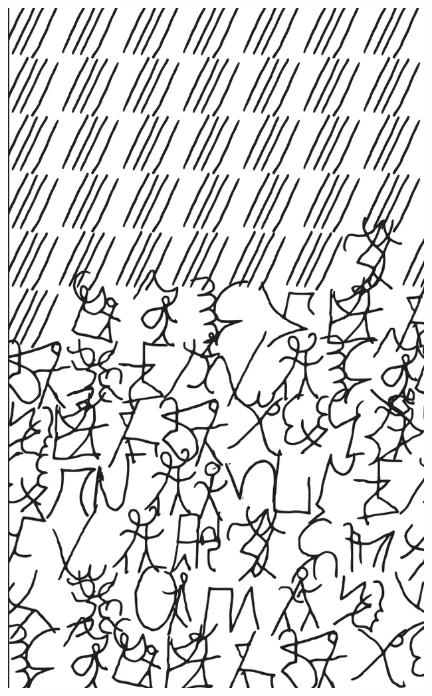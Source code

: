 \makeatletter\@openrightfalse
\movetooddpage
\begin{absolutelynopagebreak}
\begin{vplace}
\begin{figure}[H]
\begin{adjustwidth}{-0.99cm}{}
  \centering
  \vspace*{-1.77cm}
  \hspace*{-0.50cm}
  \includegraphics[width=110mm]{./imgs/img5.pdf}  
  \hfill
\end{adjustwidth}

\thispagestyle{empty}

\end{figure}
\end{vplace}

\end{absolutelynopagebreak}

